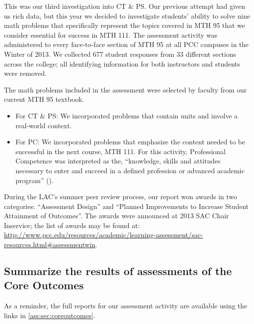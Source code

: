 \begin{description}
This was our third investigation into CT \& PS.  Our previous attempt had given us rich data, but this year we decided to investigate students' ability to solve nine math problems that specifically represent the topics covered in MTH 95 that we consider essential for success in MTH 111.  The assessment activity was administered to every face-to-face section of MTH 95 at all PCC campuses in the Winter of 2013.  We collected 677 student responses from 33 different sections across the college; all identifying information for both instructors and students were removed.

The math problems included in the assessment were selected by faculty from our current MTH 95 textbook.
\begin{itemize}
\item For CT \& PS: We incorporated problems that contain units and involve a real-world context.
\item For PC:  We incorporated problems that emphasize the content needed to be successful in the next course, MTH 111.  For this activity, Professional Competence was interpreted as the, ``knowledge, skills and attitudes necessary to enter and succeed in a defined profession or advanced academic program'' (\cite{coreoutcomes}).
\end{itemize}
During the LAC's summer peer review process, our report won awards in two categories: ``Assessment Design'' and ``Planned Improvements to Increase Student Attainment of Outcomes''.  The awards were announced at 2013 SAC Chair Inservice; the list of awards may be found at: \url{http://www.pcc.edu/resources/academic/learning-assessment/sac-resources.html#assessmentwin}.

\end{description}

\subsection{Summarize the results of assessments of the Core Outcomes}
As a reminder, the full reports for our assessment activity are available using the links in \cref{ass:sec:coreoutcomes}.


